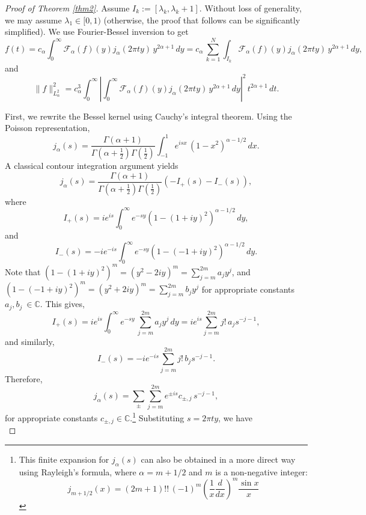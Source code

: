 \documentclass[11pt,a4paper,reqno,dvipsnames]{amsart}
\makeatletter
\newcommand{\C}{\mathbb C}
\newcommand{\citepre}[2]{%
  \begingroup
    \renewcommand\@cite[2]{[#1, ##1]}%
    \cite{#2}%
  \endgroup
}
\numberwithin{equation}{section}
\theoremstyle{plain}
\theoremstyle{definition}
\theoremstyle{remark}
\makeatother
\begin{document}
\begin{proof}[Proof of Theorem \ref{thm2}]
    
Assume $I_k := [\lambda_k, \lambda_k + 1]$. Without loss of generality, we may assume $\lambda_1 \in [0, 1)$ (otherwise, the proof that follows can be significantly simplified). We use Fourier-Bessel inversion to get
$$f(t) = c_\alpha\int_0^\infty \mathcal{F}_\alpha(f)(y) j_\alpha(2\pi ty)\, y^{2\alpha + 1}\, dy =  c_\alpha\,\sum_{k=1}^N \int_{I_k} \mathcal{F}_\alpha(f)(y) j_\alpha(2\pi ty)\, y^{2\alpha + 1}\, dy,$$
and
$$\|f\|^2_{L^2_\alpha} = c_\alpha^3 \int_0^\infty \left| \int_0^\infty \mathcal{F}_\alpha(f)(y) j_\alpha(2\pi ty)\, y^{2\alpha + 1}\, dy \right|^2\, t^{2\alpha + 1}\, dt.$$

First, we rewrite the Bessel kernel using Cauchy's integral theorem. Using the Poisson representation, 
$$j_\alpha(s) = \frac{\Gamma(\alpha + 1)}{\Gamma\left(\alpha + \frac12\right) \Gamma\left(\frac12\right)} \int_{-1}^1 e^{is x}\, (1-x^2)^{\alpha - 1/2}\, dx.$$
A classical contour integration argument \citepre{Appendix A}{ss-complex} yields
$$j_\alpha(s) = \frac{\Gamma(\alpha + 1)}{\Gamma\left(\alpha + \frac12\right) \Gamma\left(\frac12\right)} (-I_{+}(s) - I_{-}(s)),$$
where $$I_+(s) = ie^{is} \int_0^\infty e^{-sy} (1 - (1 + iy)^2)^{\alpha - 1/2}\, dy,$$
and
$$I_-(s) = -ie^{-is} \int_0^\infty e^{-sy} (1 - (-1 + iy)^2)^{\alpha - 1/2}\, dy.$$
Note that $(1 - (1+iy)^2)^m = (y^2 - 2iy)^m = \sum_{j=m}^{2m} a_j y^j$, and $(1 - (-1+iy)^2)^m = (y^2 + 2iy)^m = \sum_{j=m}^{2m} b_j y^j$ for appropriate constants $a_j, b_j\ \in \C$. This gives,
\begin{equation*}
    I_+(s) = ie^{is} \int_0^\infty e^{-sy} \, \sum_{j=m}^{2m} a_j y^j \, dy = ie^{is} \sum_{j=m}^{2m} j!\, a_j s^{-j-1},
\end{equation*}
and similarly,
\begin{equation*}
    I_-(s) = -ie^{-is} \sum_{j=m}^{2m} j!\, b_j s^{-j-1}.
\end{equation*}
Therefore,
\begin{equation*}
    j_\alpha(s) = \sum_{\pm } \sum_{j=m}^{2m} e^{\pm is} c_{\pm, j}\, s^{-j-1},
\end{equation*}
for appropriate constants $c_{\pm, j}\in \C$.\footnote{This finite expansion for $j_\alpha(s)$ can also be obtained in a more direct way using Rayleigh's formula, where $\alpha = m+1/2$ and $m$ is a non-negative integer: $$j_{m+1/2}(x) = (2m+1)!!\, (-1)^m \left(\frac{1}{x} \frac{d}{dx} \right)^m \frac{\sin x}{x}$$} Substituting $s = 2\pi ty$, we have 
\begin{equation*}

\end{equation*}
\end{proof}
\end{document}
